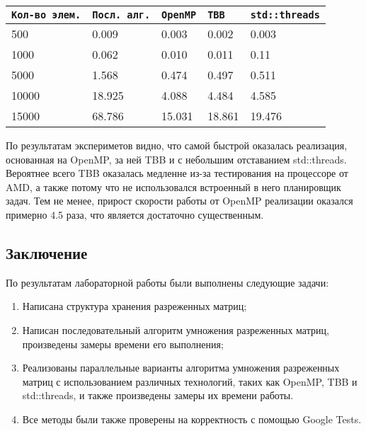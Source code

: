 \documentclass{report}
\begin{document}
\begin{tabular}{ | l | l | l | l | l | }
	\hline
	\verb|Кол-во элем.| & \verb|Посл. алг.| & \verb|OpenMP| & \verb|TBB| & \verb|std::threads| \\ \hline
	500 & 0.009 & 0.003 & 0.002 & 0.003 \\
	1000 & 0.062 & 0.010 & 0.011 & 0.11 \\
	5000 & 1.568 & 0.474 & 0.497 & 0.511 \\
	10000 & 18.925 & 4.088 & 4.484 & 4.585 \\
	15000 & 68.786 & 15.031 & 18.861 & 19.476 \\
	\hline
\end{tabular}
\par По результатам экспериметов видно, что самой быстрой оказалась реализация, основанная на OpenMP, за ней TBB и с небольшим отставанием std::threads. Вероятнее всего TBB оказалась медленне из-за тестирования на процессоре от AMD, а также потому что не использовался встроенный в него планировщик задач. Тем не менее, прирост скорости работы от OpenMP реализации оказался примерно 4.5 раза, что является достаточно существенным.
 
\newpage

\begin{center}\section*{Заключение}\end{center}

По результатам лабораторной работы были выполнены следующие задачи:

\begin{enumerate} 
\item Написана структура хранения разреженных матриц;
\item Написан последовательный алгоритм умножения разреженных матриц, произведены замеры времени его выполнения;
\item Реализованы параллельные варианты алгоритма умножения разреженных матриц с использованием различных технологий, таких как OpenMP, TBB и std::threads, и также произведены замеры их времени работы.
\item Все методы были также проверены на корректность с помощью Google Tests.
\end{enumerate} 

\newpage
\end{document}
